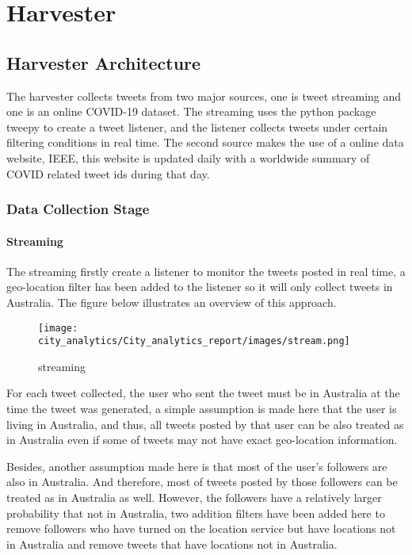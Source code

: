 \section{Harvester}
\subsection{Harvester Architecture}

The harvester collects tweets from two major sources, one is tweet streaming and one is an online COVID-19 dataset. The streaming uses the python package tweepy to create a tweet listener, and the listener collects tweets under certain filtering conditions in real time. The second source makes the use of a online data website, IEEE, this website is updated daily with a worldwide summary of COVID related tweet ids during that day.
\subsubsection{Data Collection Stage}
\paragraph{Streaming}

The streaming firstly create a listener to monitor the tweets posted in real time, a geo-location filter has been added to the listener so it will only collect tweets in Australia. The figure below illustrates an overview of this approach. 

\begin{figure}[h!]
\centering
\texttt{[image: city\_analytics/City\_analytics\_report/images/stream.png]}
\caption{streaming}
\label{fig:stream}
\end{figure}


For each tweet collected, the user who sent the tweet must be in Australia at the time the tweet was generated, a simple assumption is made here that the user is living in Australia, and thus, all tweets posted by that user can be also treated as in Australia even if some of tweets may not have exact geo-location information. 

Besides, another assumption made here is that most of the user's followers are also in Australia. And therefore, most of tweets posted by those followers can be treated as in Australia as well. However, the followers have a relatively larger probability that not in Australia, two addition filters have been added here to remove followers who have turned on the location service but have locations not in Australia and remove tweets that have locations not in Australia.

